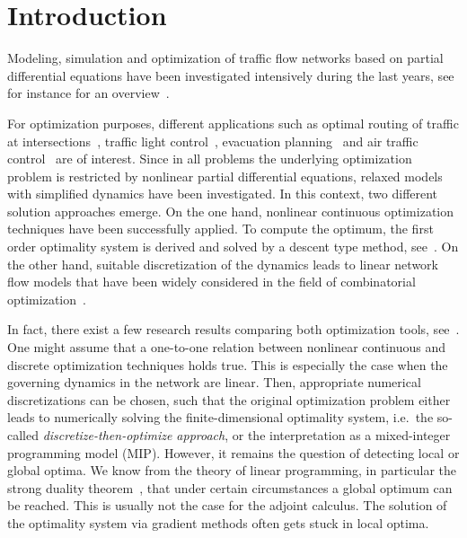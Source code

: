 \section{Introduction}
\label{chap:intro}

Modeling, simulation and optimization of traffic flow networks based on partial differential equations have been investigated intensively during the last years, 
see for instance for an overview~\cite{CoclitePiccoli, FuegenschuhHertyKlarMartin_MIP, HertyKlar2003, HertyKlar2004, HoldenRisebro, KlarKuehneWegener1996, LighthillWhitham}. 

For optimization purposes, different applications such as optimal routing of traffic at intersections~\cite{ FuegenschuhHertyKlarMartin_MIP, HertyKlar2003, HertyKlar2004}, traffic light control~\cite{GoettlichHertyZiegler2012}, evacuation planning~\cite{NHM, Hamacher} and air traffic control~\cite{BayenRaffardTomlin} are of interest. 
Since in all problems the underlying optimization problem is restricted by nonlinear partial differential equations, 
relaxed models with simplified dynamics have been investigated. In this context, two different solution approaches emerge.
On the one hand, nonlinear continuous optimization techniques have been successfully applied. 
To compute the optimum, the first order optimality system is derived and solved by a descent type method, see~\cite{Kelley1999, NashSofer1996, Spellucci1993}. 
On the other hand, suitable discretization of the dynamics leads to linear network flow models that have been widely considered in the field of combinatorial optimization~\cite{Carey2000157, Fleischer_Tardos, ford1958, koehler2005_load}.

In fact, there exist a few research results comparing both optimization tools,
see~\cite{SimonesBuch, DomschkeGeisslerKolbLangMartinMorsi2011, Fuegenschuh_et_al_MIP, FuegenschuhHertyKlarMartin_MIP, SunStrubBayen2007}. 
One might assume that a one-to-one relation between nonlinear continuous and discrete optimization techniques holds true.
This is especially the case when the governing dynamics in the network are linear. 
Then, appropriate numerical discretizations can be chosen, such that the original optimization problem 
either leads to numerically solving the finite-dimensional optimality system, i.e.\ the so-called {\em discretize-then-optimize approach},
or the interpretation as a mixed-integer programming model (MIP). However, it remains the question of detecting local or global optima. 
We know from the theory of linear programming, in particular the strong duality theorem~\cite{Chvatal1983, NemhauserWolsey1988, Schrijver1986},
that under certain circumstances a global optimum can be reached. This is usually not the case for the adjoint calculus. The solution of the optimality system 
via gradient methods often gets stuck in local optima.

